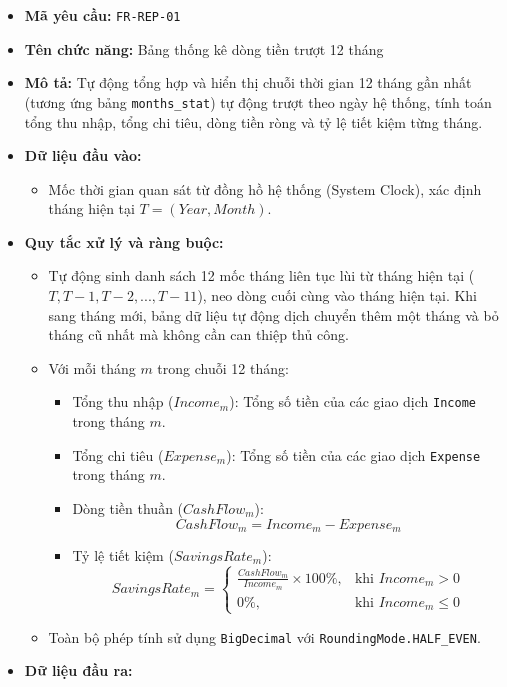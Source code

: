 \documentclass[11pt,a4paper]{article}
\providecommand{\tightlist}{
  \setlength{\itemsep}{0pt}\setlength{\parskip}{0pt}}
\begin{document}
\begin{itemize}
\tightlist
\item
  \textbf{Mã yêu cầu:} \texttt{FR-REP-01}
\item
  \textbf{Tên chức năng:} Bảng thống kê dòng tiền trượt 12 tháng
\item
  \textbf{Mô tả:} Tự động tổng hợp và hiển thị chuỗi thời gian 12 tháng
  gần nhất (tương ứng bảng \texttt{months\_stat}) tự động trượt theo
  ngày hệ thống, tính toán tổng thu nhập, tổng chi tiêu, dòng tiền ròng
  và tỷ lệ tiết kiệm từng tháng.
\item
  \textbf{Dữ liệu đầu vào:}

  \begin{itemize}
  \tightlist
  \item
    Mốc thời gian quan sát từ đồng hồ hệ thống (System Clock), xác định
    tháng hiện tại \(T = (Year, Month)\).
  \end{itemize}
\item
  \textbf{Quy tắc xử lý và ràng buộc:}

  \begin{itemize}
  \tightlist
  \item
    Tự động sinh danh sách 12 mốc tháng liên tục lùi từ tháng hiện tại
    (\(T, T-1, T-2, ..., T-11\)), neo dòng cuối cùng vào tháng hiện tại.
    Khi sang tháng mới, bảng dữ liệu tự động dịch chuyển thêm một tháng
    và bỏ tháng cũ nhất mà không cần can thiệp thủ công.
  \item
    Với mỗi tháng \(m\) trong chuỗi 12 tháng:

    \begin{itemize}
    \tightlist
    \item
      Tổng thu nhập (\(Income_m\)): Tổng số tiền của các giao dịch
      \texttt{Income} trong tháng \(m\).
    \item
      Tổng chi tiêu (\(Expense_m\)): Tổng số tiền của các giao dịch
      \texttt{Expense} trong tháng \(m\).
    \item
      Dòng tiền thuần (\(CashFlow_m\)):
      \[CashFlow_m = Income_m - Expense_m\]
    \item
      Tỷ lệ tiết kiệm (\(SavingsRate_m\)):
      \[SavingsRate_m = \begin{cases} \frac{CashFlow_m}{Income_m} \times 100\%, & \text{khi } Income_m > 0 \\ 0\%, & \text{khi } Income_m \le 0 \end{cases}\]
    \end{itemize}
  \item
    Toàn bộ phép tính sử dụng \texttt{BigDecimal} với
    \texttt{RoundingMode.HALF\_EVEN}.
  \end{itemize}
\item
  \textbf{Dữ liệu đầu ra:}


\end{itemize}
\end{document}
